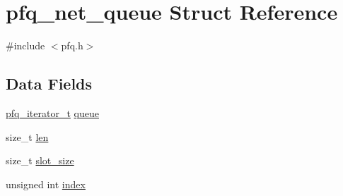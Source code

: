 \hypertarget{structpfq__net__queue}{\section{pfq\-\_\-net\-\_\-queue Struct Reference}
\label{structpfq__net__queue}
}


{\ttfamily \#include $<$pfq.\-h$>$}

\subsection*{Data Fields}
\begin{DoxyCompactItemize}
\item 
\hyperlink{pfq_8h_a6e330e8e393bb4b5ecefdd5bf47a6f57}{pfq\-\_\-iterator\-\_\-t} \hyperlink{structpfq__net__queue_a4858e72d7edbe741638986afc0ba9282}{queue}
\item 
size\-\_\-t \hyperlink{structpfq__net__queue_a4b511d3c1dbd8d9ed36008500bd44350}{len}
\item 
size\-\_\-t \hyperlink{structpfq__net__queue_ad15e389ac5a91523cccb571c094d3f4e}{slot\-\_\-size}
\item 
unsigned int \hyperlink{structpfq__net__queue_af66bc8d91f38d0d6c218c9bae8081185}{index}
\end{DoxyCompactItemize}


